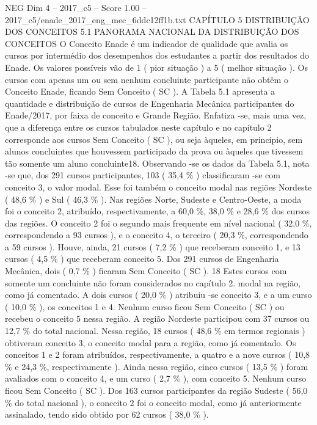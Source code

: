 \begin{textsample}{NEG Dim 4 – 2017\_c5 – Score 1.00 – 2017\_c5/enade\_2017\_eng\_mec\_6ddc12ff1b.txt}  \label{ex:f4_neg_131}
CAPÍTULO 5 DISTRIBUIÇÃO DOS CONCEITOS 5.1 PANORAMA NACIONAL DA DISTRIBUIÇÃO DOS CONCEITOS O Conceito Enade é um indicador de qualidade que avalia os cursos por intermédio dos desempenhos dos estudantes a partir dos resultados do Enade.
Os valores possíveis vão de 1 ( pior situação ) a 5 ( melhor situação ).
Os cursos com apenas um ou sem nenhum concluinte participante não obtêm o Conceito Enade, ficando Sem Conceito ( SC ).
A Tabela 5.1 apresenta a quantidade e distribuição de cursos de Engenharia Mecânica participantes do Enade/2017, por faixa de conceito e Grande Região.
Enfatiza -se, mais uma vez, que a diferença entre os cursos tabulados neste capítulo e no capítulo 2 corresponde aos cursos Sem Conceito ( SC ), ou seja àqueles, em princípio, sem alunos concluintes que houvessem participado da prova ou àqueles que tivessem tão somente um aluno concluinte18.
Observando -se os dados da Tabela 5.1, nota -se que, dos 291 cursos participantes, 103 ( 35,4 \% ) classificaram -se com conceito 3, o valor modal.
Esse foi também o conceito modal nas regiões Nordeste ( 48,6 \% ) e Sul ( 46,3 \% ).
Nas regiões Norte, Sudeste e Centro-Oeste, a moda foi o conceito 2, atribuído, respectivamente, a 60,0 \%, 38,0 \% e 28,6 \% dos cursos das regiões.
O conceito 2 foi o segundo mais frequente em nível nacional ( 32,0 \%, correspondendo a 93 cursos ), e o conceito 4, o terceiro ( 20,3 \%, correspondendo a 59 cursos ).
Houve, ainda, 21 cursos ( 7,2 \% ) que receberam conceito 1, e 13 cursos ( 4,5 \% ) que receberam conceito 5.
Dos 291 cursos de Engenharia Mecânica, dois ( 0,7 \% ) ficaram Sem Conceito ( SC ). 18 Estes cursos com somente um concluinte não foram considerados no capítulo 2. modal na região, como já comentado.
A dois cursos ( 20,0 \% ) atribuiu -se conceito 3, e a um curso ( 10,0 \% ), os conceitos 1 e 4.
Nenhum curso ficou Sem Conceito ( SC ) ou recebeu o conceito 5 nessa região.
A região Nordeste participou com 37 cursos ou 12,7 \% do total nacional.
Nessa região, 18 cursos ( 48,6 \% em termos regionais ) obtiveram conceito 3, o conceito modal para a região, como já comentado.
Os conceitos 1 e 2 foram atribuídos, respectivamente, a quatro e a nove cursos ( 10,8 \% e 24,3 \%, respectivamente ).
Ainda nessa região, cinco cursos ( 13,5 \% ) foram avaliados com o conceito 4, e um curso ( 2,7 \% ), com conceito 5.
Nenhum curso ficou Sem Conceito ( SC ).
Dos 163 cursos participantes da região Sudeste ( 56,0 \% do total nacional ), o conceito 2 foi o conceito modal, como já anteriormente assinalado, tendo sido obtido por 62 cursos ( 38,0 \% ).

\end{textsample}
